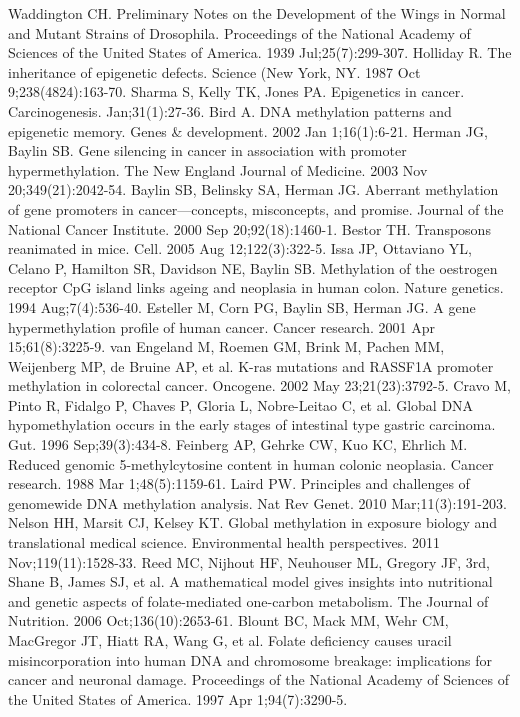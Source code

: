 \begin{thebibliography}{12}
		Waddington CH. Preliminary Notes on the Development of the Wings in Normal and Mutant Strains of Drosophila. Proceedings of the National Academy of Sciences of the United States of America. 1939 Jul;25(7):299-307. 
		Holliday R. The inheritance of epigenetic defects. Science (New York, NY. 1987 Oct 9;238(4824):163-70. 
		Sharma S, Kelly TK, Jones PA. Epigenetics in cancer. Carcinogenesis.  Jan;31(1):27-36. 
		Bird A. DNA methylation patterns and epigenetic memory. Genes \& development. 2002 Jan 1;16(1):6-21. 
		Herman JG, Baylin SB. Gene silencing in cancer in association with promoter hypermethylation. The New England Journal of Medicine. 2003 Nov 20;349(21):2042-54. 
		Baylin SB, Belinsky SA, Herman JG. Aberrant methylation of gene promoters in cancer---concepts, misconcepts, and promise. Journal of the National Cancer Institute. 2000 Sep 20;92(18):1460-1. 
		Bestor TH. Transposons reanimated in mice. Cell. 2005 Aug 12;122(3):322-5. 
		Issa JP, Ottaviano YL, Celano P, Hamilton SR, Davidson NE, Baylin SB. Methylation of the oestrogen receptor CpG island links ageing and neoplasia in human colon. Nature genetics. 1994 Aug;7(4):536-40. 
		Esteller M, Corn PG, Baylin SB, Herman JG. A gene hypermethylation profile of human cancer. Cancer research. 2001 Apr 15;61(8):3225-9. 
		van Engeland M, Roemen GM, Brink M, Pachen MM, Weijenberg MP, de Bruine AP, et al. K-ras mutations and RASSF1A promoter methylation in colorectal cancer. Oncogene. 2002 May 23;21(23):3792-5. 
		Cravo M, Pinto R, Fidalgo P, Chaves P, Gloria L, Nobre-Leitao C, et al. Global DNA hypomethylation occurs in the early stages of intestinal type gastric carcinoma. Gut. 1996 Sep;39(3):434-8. 
		Feinberg AP, Gehrke CW, Kuo KC, Ehrlich M. Reduced genomic 5-methylcytosine content in human colonic neoplasia. Cancer research. 1988 Mar 1;48(5):1159-61. 
		Laird PW. Principles and challenges of genomewide DNA methylation analysis. Nat Rev Genet. 2010 Mar;11(3):191-203. 
		Nelson HH, Marsit CJ, Kelsey KT. Global methylation in exposure biology and translational medical science. Environmental health perspectives. 2011 Nov;119(11):1528-33. 
		Reed MC, Nijhout HF, Neuhouser ML, Gregory JF, 3rd, Shane B, James SJ, et al. A mathematical model gives insights into nutritional and genetic aspects of folate-mediated one-carbon metabolism. The Journal of Nutrition. 2006 Oct;136(10):2653-61. 
		Blount BC, Mack MM, Wehr CM, MacGregor JT, Hiatt RA, Wang G, et al. Folate deficiency causes uracil misincorporation into human DNA and chromosome breakage: implications for cancer and neuronal damage. Proceedings of the National Academy of Sciences of the United States of America. 1997 Apr 1;94(7):3290-5. 

\end{thebibliography}
